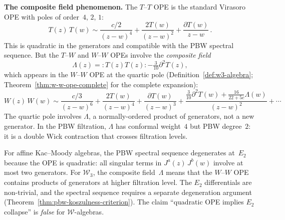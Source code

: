 \medskip
\noindent\textbf{The composite field phenomenon.}
The $T$--$T$ OPE is the standard Virasoro OPE with poles of
order~$4$, $2$, $1$:
\[
T(z)\,T(w) \sim \frac{c/2}{(z-w)^4}
 + \frac{2T(w)}{(z-w)^2}
 + \frac{\partial T(w)}{z-w}\,.
\]
This is quadratic in the generators and compatible with the
PBW spectral sequence. But the $T$--$W$ and $W$--$W$ OPEs
involve the \emph{composite field}
\begin{equation}\label{eq:frame-w3-composite}
\Lambda(z) = :\!T(z)T(z)\!: - \tfrac{3}{10}\partial^2 T(z),
\end{equation}
which appears in the $W$--$W$ OPE at the quartic pole
(Definition~\ref{def:w3-algebra}; Theorem~\ref{thm:w-w-ope-complete}
for the complete expansion):
\[
W(z)\,W(w) \sim \frac{c/3}{(z-w)^6}
 + \frac{2T(w)}{(z-w)^4}
 + \frac{\partial T(w)}{(z-w)^3}
 + \frac{\tfrac{3}{10}\partial^2 T(w)
 + \tfrac{16}{22+5c}\Lambda(w)}{(z-w)^2}
 + \cdots
\]
The quartic pole involves $\Lambda$, a normally-ordered product of
generators, not a new generator. In the PBW filtration, $\Lambda$
has conformal weight~$4$ but PBW degree~$2$: it is a double Wick
contraction that crosses filtration levels.

\begin{remark}
\label{rem:frame-pbw-warning}
For affine Kac--Moody algebras, the PBW spectral sequence degenerates
at~$E_2$ because the OPE is quadratic: all singular terms in
$J^a(z)\,J^b(w)$ involve at most two generators. For $\mathcal{W}_3$,
the composite field~$\Lambda$ means that the $W$--$W$ OPE contains
products of generators at higher filtration level. The $E_2$
differentials are non-trivial, and the spectral sequence requires
a separate degeneration argument
(Theorem~\ref{thm:pbw-koszulness-criterion}). The claim ``quadratic
OPE implies $E_2$ collapse'' is \emph{false} for $\mathcal{W}$-algebras.
\end{remark}

